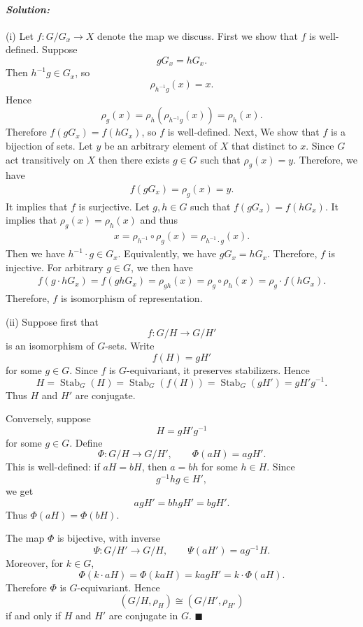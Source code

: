 \documentclass[12pt, a4paper]{article}
\theoremstyle{remark}
\newenvironment{solution}
  {\paragraph{\textit{Solution:}}\par\medskip}
  {\hfill$\blacksquare$\vspace{0.1cm}}
\begin{document}
\begin{solution}
    (i) Let $f:G/G_x\to X$ denote the map we discuss. First we show that \(f\) is well-defined. Suppose
\[
gG_x=hG_x.
\]
Then \(h^{-1}g\in G_x\), so
\[
\rho_{h^{-1}g}(x)=x.
\]
Hence
\[
\rho_g(x)=\rho_h(\rho_{h^{-1}g}(x))=\rho_h(x).
\]
Therefore \(f(gG_x)=f(hG_x)\), so \(f\) is well-defined.
    Next, We show that $f$ is a bijection of sets. Let $y$ be an arbitrary element of $X$ that distinct to $x$. 
    Since $G$ act transitively on $X$ then there exists $g\in G$ such that $\rho_g(x)=y$. Therefore, we have 
    \begin{align*}
        f(gG_x) = \rho_g(x) = y.
    \end{align*}
    It implies that $f$ is surjective. Let $g,h\in G$ such that $f(gG_x) = f(hG_x)$. It implies that $\rho_g(x)=\rho_h(x)$ and thus 
    \begin{align*}
        x = \rho_{h^{-1}}\circ\rho_g(x) = \rho_{h^{-1}\cdot g}(x).
    \end{align*} 
    Then we have $h^{-1}\cdot g\in G_x$. Equivalently, we have $gG_x = hG_x$. Therefore, $f$ is injective. 
    For arbitrary $g\in G$, we then have 
    \begin{align*}
        f(g\cdot hG_x) = f(gh G_x) = \rho_{gh}(x) = \rho_g\circ\rho_h(x) = \rho_g \cdot f(hG_x).
    \end{align*}
    Therefore, $f$ is isomorphism of representation.

    (ii) Suppose first that
\[
f:G/H\to G/H'
\]
is an isomorphism of \(G\)-sets. Write
\[
f(H)=gH'
\]
for some \(g\in G\). Since \(f\) is \(G\)-equivariant, it preserves stabilizers. Hence
\[
H=\operatorname{Stab}_G(H)
=\operatorname{Stab}_G(f(H))
=\operatorname{Stab}_G(gH')
=gH'g^{-1}.
\]
Thus \(H\) and \(H'\) are conjugate.

Conversely, suppose
\[
H=gH'g^{-1}
\]
for some \(g\in G\). Define
\[
\Phi:G/H\to G/H',
\qquad
\Phi(aH)=agH'.
\]
This is well-defined: if \(aH=bH\), then \(a=bh\) for some \(h\in H\). Since
\[
g^{-1}hg\in H',
\]
we get
\[
agH'=bhgH'=bgH'.
\]
Thus \(\Phi(aH)=\Phi(bH)\).

The map \(\Phi\) is bijective, with inverse
\[
\Psi:G/H'\to G/H,
\qquad
\Psi(aH')=ag^{-1}H.
\]
Moreover, for \(k\in G\),
\[
\Phi(k\cdot aH)
=
\Phi(kaH)
=
kagH'
=
k\cdot \Phi(aH).
\]
Therefore \(\Phi\) is \(G\)-equivariant. Hence
\[
(G/H,\rho_H)\cong (G/H',\rho_{H'})
\]
if and only if \(H\) and \(H'\) are conjugate in \(G\).
\end{solution}
\end{document}
